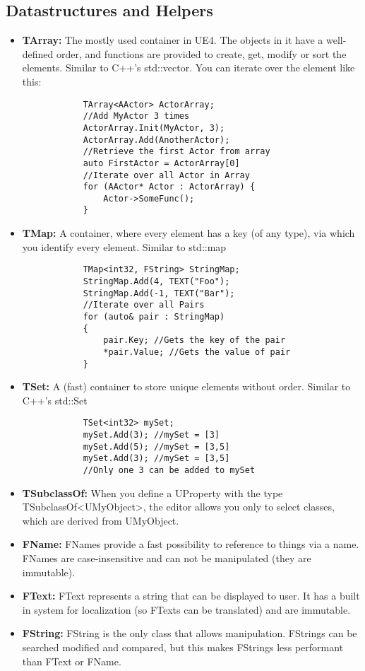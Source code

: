 \documentclass[10pt,a4paper]{article}
\begin{document}
\begin{multicols*}{2}
	\subsection{Datastructures and Helpers}
	\begin{itemize}
		\item \textbf{TArray:} The mostly used container in UE4. The objects in it have a well-defined order, and functions are provided to create, get, modify or sort the elements. Similar to C++'s std::vector. You can iterate over the element like this:
		\begin{verbatim}
			TArray<AActor> ActorArray;
			//Add MyActor 3 times
			ActorArray.Init(MyActor, 3);
			ActorArray.Add(AnotherActor);
			//Retrieve the first Actor from array
			auto FirstActor = ActorArray[0]
			//Iterate over all Actor in Array
			for (AActor* Actor : ActorArray) {
			    Actor->SomeFunc(); 
			}
		\end{verbatim}
		\item \textbf{TMap:} A container, where every element has a key (of any type), via which you identify every element. Similar to std::map
		\begin{verbatim}
			TMap<int32, FString> StringMap;
			StringMap.Add(4, TEXT("Foo");
			StringMap.Add(-1, TEXT("Bar");
			//Iterate over all Pairs
			for (auto& pair : StringMap)
			{
			    pair.Key; //Gets the key of the pair
			    *pair.Value; //Gets the value of pair
			}
		\end{verbatim}
		\item \textbf{TSet:} A (fast) container to store unique elements without order. Similar to C++'s std::Set
			\begin{verbatim}
			TSet<int32> mySet;
			mySet.Add(3); //mySet = [3]
			mySet.Add(5); //mySet = [3,5]
			mySet.Add(3); //mySet = [3,5]
			//Only one 3 can be added to mySet
			\end{verbatim}
		\item \textbf{TSubclassOf:} When you define a UProperty with the type TSubclassOf{\textless}UMyObject{\textgreater}, the editor allows you only to select classes, which are derived from UMyObject.
		\item \textbf{FName:} FNames provide a fast possibility to reference to things via a name. FNames are case-insensitive and can not be manipulated (they are immutable).
		\item \textbf{FText:} FText represents a string that can be displayed to user. It has a built in system for localization (so FTexts can be translated) and are immutable.
		\item \textbf{FString:} FString is the only class that allows manipulation. FStrings can be searched modified and compared, but this makes FStrings less performant than FText or FName.
	\end{itemize}


\end{multicols*}
\end{document}
